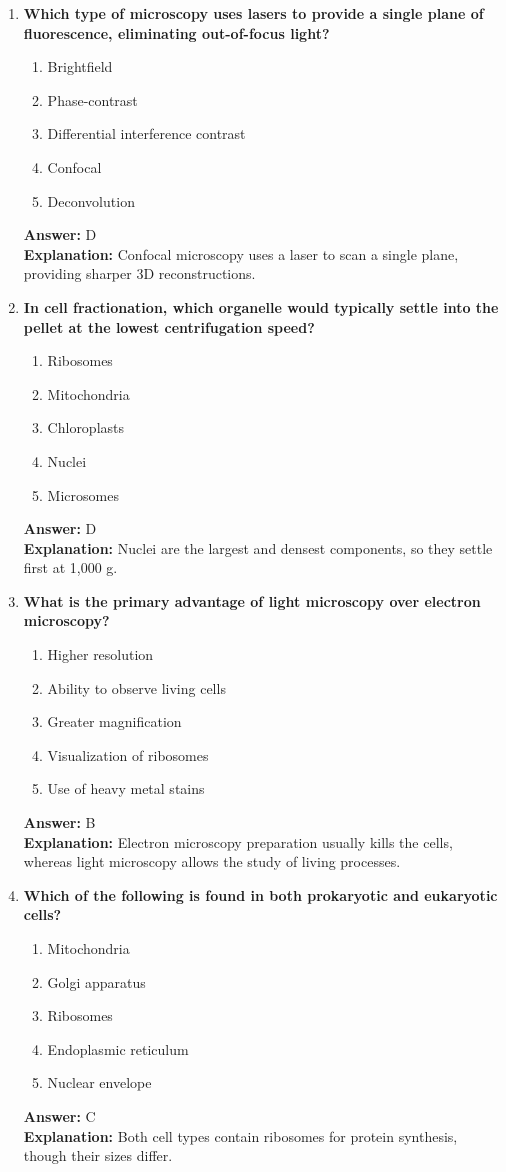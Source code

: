 \documentclass[11pt, a4paper]{article}
\begin{document}
\begin{enumerate}[leftmargin=*, label=\arabic*.]
\item \textbf{Which type of microscopy uses lasers to provide a single plane of fluorescence, eliminating out-of-focus light?}
\begin{enumerate}[label=\Alph*.]
\item Brightfield
\item Phase-contrast
\item Differential interference contrast
\item Confocal
\item Deconvolution
\end{enumerate}
\textbf{Answer:} D \\
\textbf{Explanation:} Confocal microscopy uses a laser to scan a single plane, providing sharper 3D reconstructions.

\item \textbf{In cell fractionation, which organelle would typically settle into the pellet at the lowest centrifugation speed?}
\begin{enumerate}[label=\Alph*.]
\item Ribosomes
\item Mitochondria
\item Chloroplasts
\item Nuclei
\item Microsomes
\end{enumerate}
\textbf{Answer:} D \\
\textbf{Explanation:} Nuclei are the largest and densest components, so they settle first at 1,000 g.

\item \textbf{What is the primary advantage of light microscopy over electron microscopy?}
\begin{enumerate}[label=\Alph*.]
\item Higher resolution
\item Ability to observe living cells
\item Greater magnification
\item Visualization of ribosomes
\item Use of heavy metal stains
\end{enumerate}
\textbf{Answer:} B \\
\textbf{Explanation:} Electron microscopy preparation usually kills the cells, whereas light microscopy allows the study of living processes.

\item \textbf{Which of the following is found in both prokaryotic and eukaryotic cells?}
\begin{enumerate}[label=\Alph*.]
\item Mitochondria
\item Golgi apparatus
\item Ribosomes
\item Endoplasmic reticulum
\item Nuclear envelope
\end{enumerate}
\textbf{Answer:} C \\
\textbf{Explanation:} Both cell types contain ribosomes for protein synthesis, though their sizes differ.


\end{enumerate}
\end{document}
